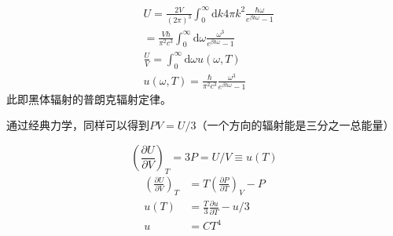 \documentclass[12pt, a4paper, oneside]{ctexbook}
\newcounter{#2}
\newcounter{#2}[#1]
\numberwithin{#2}{#1}
\begin{document}
          \begin{deduce}
            \begin{equation}
              \begin{aligned}
                & U=\frac{2 V}{(2 \pi)^3} \int_0^{\infty} \mathrm{d} k 4 \pi k^2 \frac{\hbar \omega}{e^{\beta \hbar \omega}-1} \\
                &=\frac{V \hbar}{\pi^2 c^3} \int_0^{\infty} \mathrm{d} \omega \frac{\omega^3}{e^{\beta \hbar \omega}-1} \\
                & \frac{U}{V}=\int_0^{\infty} \mathrm{d} \omega u(\omega, T) \\
                & u(\omega, T)=\frac{\hbar}{\pi^2 c^3} \frac{\omega^3}{e^{\beta \hbar \omega}-1}
                \end{aligned}
            \end{equation}
            此即黑体辐射的普朗克辐射定律。
          \end{deduce}
          \begin{deduce}
            通过经典力学，同样可以得到\(PV=U/3\)（一个方向的辐射能是三分之一总能量）
            
              $$
              \left(\frac{\partial U}{\partial V}\right)_T=3 P=U / V \equiv u(T)
              $$
              $$
              \begin{aligned}
              \left(\frac{\partial U}{\partial V}\right)_T & =T\left(\frac{\partial P}{\partial T}\right)_V-P \\
              u(T) & =\frac{T}{3} \frac{\partial u}{\partial T}-u / 3 \\
              u & =C T^4
              \end{aligned}
              $$
          \end{deduce}
\end{document}
